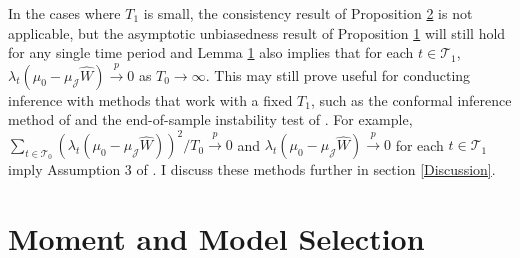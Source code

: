 \documentclass{article}
\begin{document}
\par 
In the cases where $T_1$ is small, the consistency result of Proposition \hyperref[P2]{2} is not applicable, but the asymptotic unbiasedness result of Proposition \hyperref[P1]{1} will still hold for any single time period and Lemma \hyperref[L1]{1} also implies that for each $t \in \mathcal{T}_1$, $\lambda_t(\mu_0 - \mu_{\mathcal{J}}\hat{W}) \overset{p}{\rightarrow} 0$ as $T_0 \rightarrow \infty$. This may still prove useful for conducting inference with methods that work with a fixed $T_1$, such as the conformal inference method of \cite{ConformalInference} and the end-of-sample instability test of \cite{Andrews2003}. For example, $\sum_{t \in \mathcal{T}_0}(\lambda_t(\mu_0 - \mu_{\mathcal{J}}\hat{W}))^2/T_0 \overset{p}{\rightarrow} 0$ and $\lambda_t(\mu_0 - \mu_{\mathcal{J}}\hat{W}) \overset{p}{\rightarrow} 0$ for each $t \in \mathcal{T}_1$ imply Assumption 3 of \cite{ConformalInference}. I discuss these methods further in section \ref{Discussion}.

\section{Moment and Model Selection} \label{Moment and Model Selection}
\end{document}
